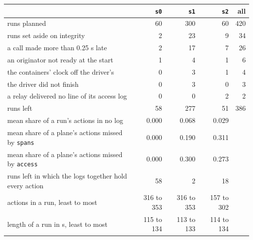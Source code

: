 \begin{tabular}{lrrrr}
\toprule
 & \texttt{s0} & \texttt{s1} & \texttt{s2} & all \\
\midrule
runs planned & 60 & 300 & 60 & 420 \\
runs set aside on integrity & 2 & 23 & 9 & 34 \\
\quad a call made more than 0.25 s late & 2 & 17 & 7 & 26 \\
\quad an originator not ready at the start & 1 & 4 & 1 & 6 \\
\quad the containers' clock off the driver's & 0 & 3 & 1 & 4 \\
\quad the driver did not finish & 0 & 3 & 0 & 3 \\
\quad a relay delivered no line of its access log & 0 & 0 & 2 & 2 \\
\midrule
runs left & 58 & 277 & 51 & 386 \\
mean share of a run's actions in no log & 0.000 & 0.068 & 0.029 &  \\
mean share of a plane's actions missed by \texttt{spans} & 0.000 & 0.190 & 0.311 &  \\
mean share of a plane's actions missed by \texttt{access} & 0.000 & 0.300 & 0.273 &  \\
runs left in which the logs together hold every action & 58 & 2 & 18 &  \\
actions in a run, least to most & 316 to 353 & 316 to 353 & 157 to 302 &  \\
length of a run in s, least to most & 115 to 134 & 113 to 133 & 114 to 134 &  \\
\bottomrule
\end{tabular}
\par{}
